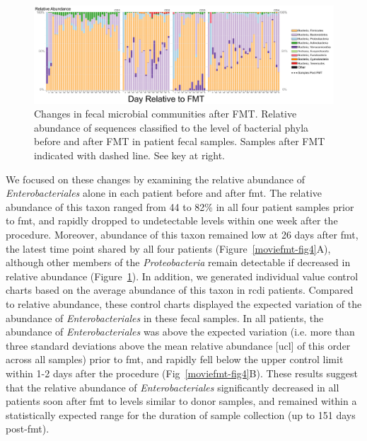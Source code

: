 \begin{figure}
\includegraphics[width=\textheight]{moviefmt-figures/figure-3}
\caption[Changes in fecal microbial communities after FMT.]{Changes in fecal microbial communities after FMT. Relative abundance of sequences classified to the level of bacterial phyla before and after FMT in patient fecal samples. Samples after FMT indicated with dashed line. See key at right.}
\label{moviefmt-fig3}
\end{figure}

We focused on these changes by examining the relative abundance of \textit{Enterobacteriales} alone in each patient before and after \gls{fmt}. The relative abundance of this taxon ranged from 44 to 82\% in all four patient samples prior to \gls{fmt}, and rapidly dropped to undetectable levels within one week after the procedure. Moreover, abundance of this taxon remained low at 26 days after \gls{fmt}, the latest time point shared by all four patients (Figure~\ref{moviefmt-fig4}A), although other members of the \textit{Proteobacteria} remain detectable if decreased in relative abundance (Figure~\ref{moviefmt-fig3}). In addition, we generated individual value control charts based on the average abundance of this taxon in \gls{rcdi} patients. Compared to relative abundance, these control charts displayed the expected variation of the abundance of \textit{Enterobacteriales} in these fecal samples. In all patients, the abundance of \textit{Enterobacteriales} was above the expected variation (i.e. more than three standard deviations above the mean relative abundance [\gls{ucl}] of this order across all samples) prior to \gls{fmt}, and rapidly fell below the upper control limit within 1-2 days after the procedure (Fig~\ref{moviefmt-fig4}B). These results suggest that the relative abundance of \textit{Enterobacteriales} significantly decreased in all patients soon after \gls{fmt} to levels similar to donor samples, and remained within a statistically expected range for the duration of sample collection (up to 151 days post-\gls{fmt}).


